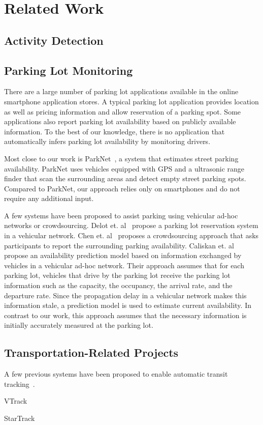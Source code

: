 \section{Related Work}
\label{sec-related}

\subsection{Activity Detection}

\subsection{Parking Lot Monitoring}

There are a large number of parking lot applications available in the online
smartphone application stores. A typical parking lot application provides
location as well as pricing information and allow reservation of a parking spot.
Some applications also report parking lot availability based on publicly
available information. To the best of our knowledge, there is no application
that automatically infers parking lot availability by monitoring drivers.

Most close to our work is ParkNet~\cite{Mathur:2010:PDS}, a system that
estimates street parking availability. ParkNet uses vehicles equipped with GPS
and a ultrasonic range finder that scan the surrounding areas and detect
empty street parking spots. Compared to ParkNet, our approach relies only on
smartphones and do not require any additional input.

A few systems have been proposed to assist parking using vehicular ad-hoc
networks or crowdsourcing. Delot et. al~\cite{Delot:2009:CRP} propose a parking
lot reservation system in a vehicular network. Chen et. al~\cite{Chen:2012:COS}
proposes a crowdsourcing approach that asks participants to report the
surrounding parking availability. Caliskan et. al~\cite{4212497} propose an
availability prediction model based on information exchanged by vehicles in a
vehicular ad-hoc network. Their approach assumes that for each parking lot,
vehicles that drive by the parking lot receive the parking lot information such
as the capacity, the occupancy, the arrival rate, and the departure rate. Since
the propagation delay in a vehicular network makes this information stale, a
prediction model is used to estimate current availability. In contrast to
our work, this approach assumes that the necessary information is initially
accurately measured at the parking lot.

\subsection{Transportation-Related Projects}

A few previous systems have been proposed to enable automatic transit
tracking~\cite{Biagioni:2011:EAT, Thiagarajan:2010:CTT, Zhou:2012:LWP}. 

VTrack~\cite{Thiagarajan:2009:VAE}

StarTrack~\cite{Ananthanarayanan:2009:SFE}
